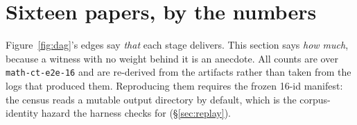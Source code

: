 \section{Sixteen papers, by the numbers}
\label{sec:numbers}

Figure~\ref{fig:dag}'s edges say \emph{that} each stage delivers. This section
says \emph{how much}, because a witness with no weight behind it is an anecdote.
All counts are over \texttt{math-ct-e2e-16} and are re-derived from the
artifacts rather than taken from the logs that produced them. Reproducing them
requires the frozen 16-id manifest: the census reads a mutable output directory
by default, which is the corpus-identity hazard the harness checks for
(\S\ref{sec:replay}).

